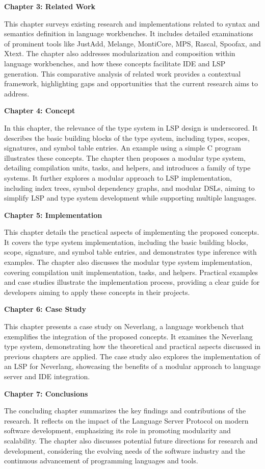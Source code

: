 \textbf{Chapter 3: Related Work}

This chapter surveys existing research and implementations related to syntax and semantics definition in language workbenches. It includes detailed examinations of prominent tools like JustAdd, Melange, MontiCore, MPS, Rascal, Spoofax, and Xtext. The chapter also addresses modularization and composition within language workbenches, and how these concepts facilitate IDE and LSP generation. This comparative analysis of related work provides a contextual framework, highlighting gaps and opportunities that the current research aims to address.

\textbf{Chapter 4: Concept}

In this chapter, the relevance of the type system in LSP design is underscored. It describes the basic building blocks of the type system, including types, scopes, signatures, and symbol table entries. An example using a simple C program illustrates these concepts. The chapter then proposes a modular type system, detailing compilation units, tasks, and helpers, and introduces a family of type systems. It further explores a modular approach to LSP implementation, including index trees, symbol dependency graphs, and modular DSLs, aiming to simplify LSP and type system development while supporting multiple languages.

\textbf{Chapter 5: Implementation}

This chapter details the practical aspects of implementing the proposed concepts. It covers the type system implementation, including the basic building blocks, scope, signature, and symbol table entries, and demonstrates type inference with examples. The chapter also discusses the modular type system implementation, covering compilation unit implementation, tasks, and helpers. Practical examples and case studies illustrate the implementation process, providing a clear guide for developers aiming to apply these concepts in their projects.

\textbf{Chapter 6: Case Study}

This chapter presents a case study on Neverlang, a language workbench that exemplifies the integration of the proposed concepts. It examines the Neverlang type system, demonstrating how the theoretical and practical aspects discussed in previous chapters are applied. The case study also explores the implementation of an LSP for Neverlang, showcasing the benefits of a modular approach to language server and IDE integration.

\textbf{Chapter 7: Conclusions}

The concluding chapter summarizes the key findings and contributions of the research. It reflects on the impact of the Language Server Protocol on modern software development, emphasizing its role in promoting modularity and scalability. The chapter also discusses potential future directions for research and development, considering the evolving needs of the software industry and the continuous advancement of programming languages and tools.


